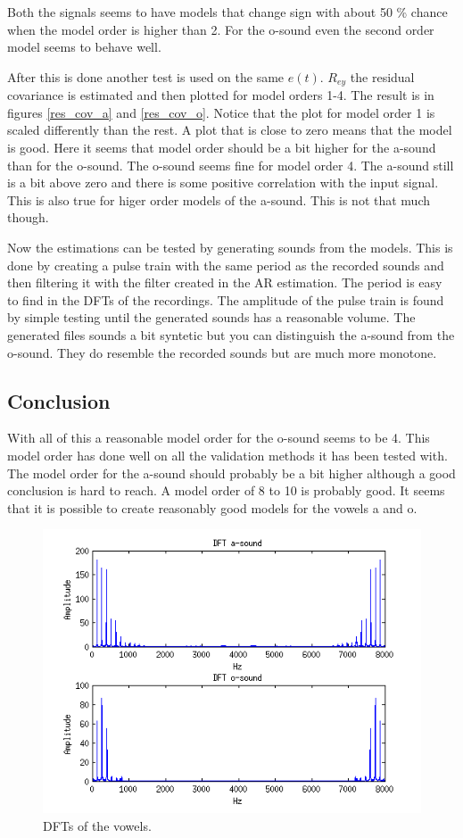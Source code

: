 \documentclass[12pt]{article}
\begin{document}
Both the signals seems to have models that change sign with about 50 \% chance when the model order is higher than 2.
For the o-sound even the second order model seems to behave well.

After this is done another test is used on the same $e(t)$.
$R_{ey}$ the residual covariance is estimated and then plotted for model orders 1-4.
The result is in figures \ref{res_cov_a} and \ref{res_cov_o}.
Notice that the plot for model order 1 is scaled differently than the rest.
A plot that is close to zero means that the model is good.
Here it seems that model order should be a bit higher for the a-sound than for the o-sound.
The o-sound seems fine for model order 4.
The a-sound still is a bit above zero and there is some positive correlation with the input signal.
This is also true for higer order models of the a-sound.
This is not that much though.

Now the estimations can be tested by generating sounds from the models.
This is done by creating a pulse train with the same period as the recorded sounds and then filtering it with the filter created in the AR estimation.
The period is easy to find in the DFTs of the recordings.
The amplitude of the pulse train is found by simple testing until the generated sounds has a reasonable volume.
The generated files sounds a bit syntetic but you can distinguish the a-sound from the o-sound.
They do resemble the recorded sounds but are much more monotone.

\subsection{Conclusion}

With all of this a reasonable model order for the o-sound seems to be 4.
This model order has done well on all the validation methods it has been tested with.
The model order for the a-sound should probably be a bit higher although a good conclusion is hard to reach.
A model order of 8 to 10 is probably good.
It seems that it is possible to create reasonably good models for the vowels a and o.

\begin{figure}[H]
  \centering
  \includegraphics[width=14cm]{vowel_fft.png}
  \caption{
    \label{vowel_DFT}
    DFTs of the vowels.}
\end{figure}
\end{document}
